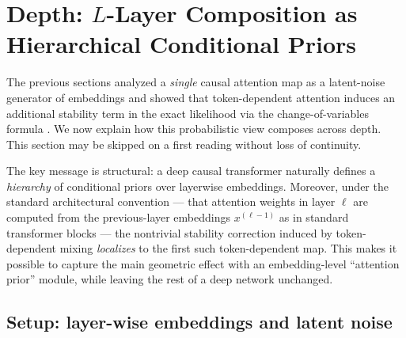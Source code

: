 \documentclass[11pt]{article}
\begin{document}

\section{Depth: \texorpdfstring{$L$}{L}-Layer Composition as Hierarchical Conditional Priors}
\label{sec:deep_hierarchy}

The previous sections analyzed a \emph{single} causal attention map as a latent-noise generator of
embeddings and showed that token-dependent attention induces an additional stability term in the
exact likelihood via the change-of-variables formula \citep{PapamakariosNaReMoLa21}.
We now explain how this probabilistic view composes across depth. This section may be skipped on a first reading without loss of continuity.

The key message is structural:
a deep causal transformer naturally defines a \emph{hierarchy} of conditional priors over layerwise
embeddings. Moreover, under the standard architectural convention --- that attention weights in layer
$\ell$ are computed from the previous-layer embeddings $x^{(\ell-1)}$ as in standard transformer blocks
\citep{VaswaniShPaUsJoGoKaPo17,XiongZoLiSo16} --- the nontrivial stability
correction induced by token-dependent mixing \emph{localizes} to the first such token-dependent map.
This makes it possible to capture the main geometric effect with an embedding-level ``attention prior''
module, while leaving the rest of a deep network unchanged.

\subsection{Setup: layer-wise embeddings and latent noise}
\label{subsec:deep_setup}
\end{document}

